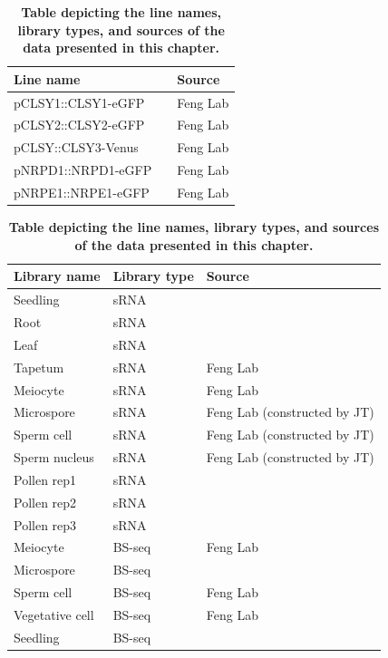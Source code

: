 \begin{table}[htbp]
\centering
\begin{tabular}{|p{5cm}|p{3cm}|p{5cm}|}
\hline
\textbf{Line name} & & \textbf{Source} \\
\hline
pCLSY1::CLSY1-eGFP & & Feng Lab \\
pCLSY2::CLSY2-eGFP & & Feng Lab \\
pCLSY::CLSY3-Venus & &Feng Lab \\
pNRPD1::NRPD1-eGFP & & Feng Lab \\
pNRPE1::NRPE1-eGFP & & Feng Lab \\
\hline
\end{tabular}
\begin{tabular}{|p{5cm}|p{3cm}|p{5cm}|} %
\hline
\textbf{Library name} & \textbf{Library type} & \textbf{Source} \\
\hline
Seedling & sRNA & \cite{RN300} \\
Root & sRNA & \cite{RN301}  \\
Leaf & sRNA & \cite {RN302} \\
Tapetum & sRNA & Feng Lab \\
Meiocyte & sRNA & Feng Lab \\
Microspore & sRNA & Feng Lab (constructed by JT) \\
Sperm cell & sRNA & Feng Lab (constructed by JT) \\
Sperm nucleus & sRNA & Feng Lab (constructed by JT) \\
Pollen rep1 & sRNA & \cite{RN303}  \\
Pollen rep2 & sRNA & \cite{RN304}  \\
Pollen rep3 & sRNA & \cite{RN305}  \\
\hline
Meiocyte & BS-seq & Feng Lab \\
Microspore & BS-seq & \cite{RN306}  \\
Sperm cell & BS-seq & Feng Lab \\
Vegetative cell & BS-seq & Feng Lab \\
Seedling & BS-seq & \cite{RN307}  \\
\hline
\end{tabular}
\caption{\textbf{Table depicting the line names, library types, and sources of the data presented in this chapter.}}
\label{ch2:workbyothers}
\end{table}


